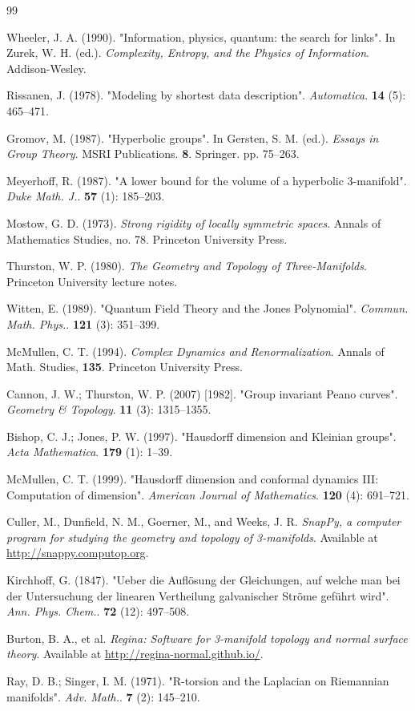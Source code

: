 \documentclass[11pt, a4paper]{article}
\theoremstyle{definition}
\theoremstyle{definition}
\begin{document}
\newpage
\begin{thebibliography}{99}

Wheeler, J. A. (1990). "Information, physics, quantum: the search for links". In Zurek, W. H. (ed.). \textit{Complexity, Entropy, and the Physics of Information}. Addison-Wesley.

Rissanen, J. (1978). "Modeling by shortest data description". \textit{Automatica}. \textbf{14} (5): 465--471.

Gromov, M. (1987). "Hyperbolic groups". In Gersten, S. M. (ed.). \textit{Essays in Group Theory}. MSRI Publications. \textbf{8}. Springer. pp. 75--263.

Meyerhoff, R. (1987). "A lower bound for the volume of a hyperbolic 3-manifold". \textit{Duke Math. J.}. \textbf{57} (1): 185--203.

Mostow, G. D. (1973). \textit{Strong rigidity of locally symmetric spaces}. Annals of Mathematics Studies, no. 78. Princeton University Press.

Thurston, W. P. (1980). \textit{The Geometry and Topology of Three-Manifolds}. Princeton University lecture notes.

Witten, E. (1989). "Quantum Field Theory and the Jones Polynomial". \textit{Commun. Math. Phys.}. \textbf{121} (3): 351--399.

McMullen, C. T. (1994). \textit{Complex Dynamics and Renormalization}. Annals of Math. Studies, \textbf{135}. Princeton University Press.

Cannon, J. W.; Thurston, W. P. (2007) [1982]. "Group invariant Peano curves". \textit{Geometry \& Topology}. \textbf{11} (3): 1315--1355.

Bishop, C. J.; Jones, P. W. (1997). "Hausdorff dimension and Kleinian groups". \textit{Acta Mathematica}. \textbf{179} (1): 1--39.

McMullen, C. T. (1999). "Hausdorff dimension and conformal dynamics III: Computation of dimension". \textit{American Journal of Mathematics}. \textbf{120} (4): 691--721.

Culler, M., Dunfield, N. M., Goerner, M., and Weeks, J. R. \textit{SnapPy, a computer program for studying the geometry and topology of 3-manifolds}. Available at \url{http://snappy.computop.org}.

Kirchhoff, G. (1847). "Ueber die Auflösung der Gleichungen, auf welche man bei der Untersuchung der linearen Vertheilung galvanischer Ströme geführt wird". \textit{Ann. Phys. Chem.}. \textbf{72} (12): 497--508.

Burton, B. A., et al. \textit{Regina: Software for 3-manifold topology and normal surface theory}. Available at \url{http://regina-normal.github.io/}.

Ray, D. B.; Singer, I. M. (1971). "R-torsion and the Laplacian on Riemannian manifolds". \textit{Adv. Math.}. \textbf{7} (2): 145--210.

\end{thebibliography}
\end{document}
